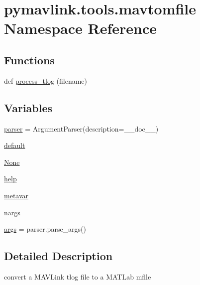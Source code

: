 \hypertarget{namespacepymavlink_1_1tools_1_1mavtomfile}{}\section{pymavlink.\+tools.\+mavtomfile Namespace Reference}
\label{namespacepymavlink_1_1tools_1_1mavtomfile}
\subsection*{Functions}
\begin{DoxyCompactItemize}
\item 
def \mbox{\hyperlink{namespacepymavlink_1_1tools_1_1mavtomfile_aa9bda5eaab8f660bdd5f3a366ade93e3}{process\+\_\+tlog}} (filename)
\end{DoxyCompactItemize}
\subsection*{Variables}
\begin{DoxyCompactItemize}
\item 
\mbox{\hyperlink{namespacepymavlink_1_1tools_1_1mavtomfile_af7ff9c2839aabb61ddecabc813328efc}{parser}} = Argument\+Parser(description=\+\_\+\+\_\+doc\+\_\+\+\_\+)
\item 
\mbox{\hyperlink{namespacepymavlink_1_1tools_1_1mavtomfile_a94ea2c4b2ef375dc4d85e03b88ab15f6}{default}}
\item 
\mbox{\hyperlink{namespacepymavlink_1_1tools_1_1mavtomfile_a0bf324c31825939e1d9e7aad626a48ac}{None}}
\item 
\mbox{\hyperlink{namespacepymavlink_1_1tools_1_1mavtomfile_a8d08d0c14916bc0aa3e5f64ea850ba86}{help}}
\item 
\mbox{\hyperlink{namespacepymavlink_1_1tools_1_1mavtomfile_a9ab176a8b95f4333b464080b95bf8546}{metavar}}
\item 
\mbox{\hyperlink{namespacepymavlink_1_1tools_1_1mavtomfile_aace27b9425296856d5e9a23be1767d35}{nargs}}
\item 
\mbox{\hyperlink{namespacepymavlink_1_1tools_1_1mavtomfile_a6e2cc01451a78fe594cca2991f09eff0}{args}} = parser.\+parse\+\_\+args()
\end{DoxyCompactItemize}


\subsection{Detailed Description}
\begin{DoxyVerb}convert a MAVLink tlog file to a MATLab mfile
\end{DoxyVerb}
 

